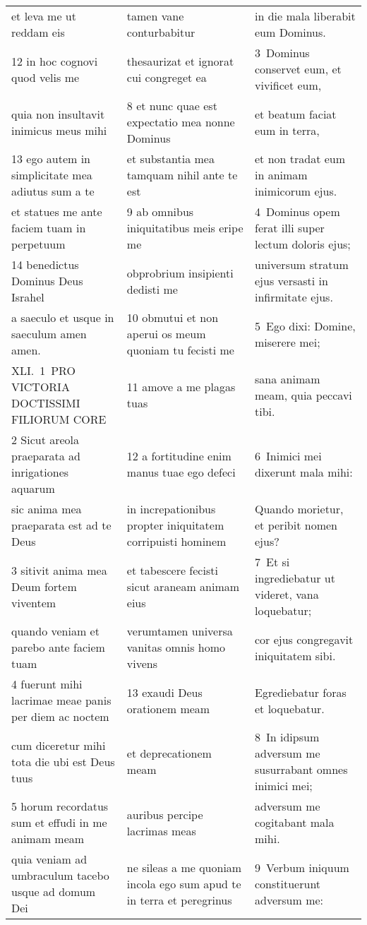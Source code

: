 \documentclass{article}
\begin{document}
\begin{longtable}{@{}p{}p{}p{}@{}}
et leva me ut reddam eis	&	tamen vane conturbabitur	&	in die mala liberabit eum Dominus.	\\
12 in hoc cognovi quod velis me	&	thesaurizat et ignorat cui congreget ea	&	3 Dominus conservet eum, et vivificet eum,	\\
quia non insultavit inimicus meus mihi	&	8 et nunc quae est expectatio mea nonne Dominus	&	et beatum faciat eum in terra,	\\
13 ego autem in simplicitate mea adiutus sum a te	&	et substantia mea tamquam nihil ante te est	&	et non tradat eum in animam inimicorum ejus.	\\
et statues me ante faciem tuam in perpetuum	&	9 ab omnibus iniquitatibus meis eripe me	&	4 Dominus opem ferat illi super lectum doloris ejus;	\\
14 benedictus Dominus Deus Israhel	&	obprobrium insipienti dedisti me	&	universum stratum ejus versasti in infirmitate ejus.	\\
a saeculo et usque in saeculum amen amen.	&	10 obmutui et non aperui os meum quoniam tu fecisti me	&	5 Ego dixi: Domine, miserere mei;	\\
XLI. 1 PRO VICTORIA DOCTISSIMI FILIORUM CORE	&	11 amove a me plagas tuas	&	sana animam meam, quia peccavi tibi.	\\
2 Sicut areola praeparata ad inrigationes aquarum	&	12 a fortitudine enim manus tuae ego defeci	&	6 Inimici mei dixerunt mala mihi:	\\
sic anima mea praeparata est ad te Deus	&	in increpationibus propter iniquitatem corripuisti hominem	&	Quando morietur, et peribit nomen ejus?	\\
3 sitivit anima mea Deum fortem viventem	&	et tabescere fecisti sicut araneam animam eius	&	7 Et si ingrediebatur ut videret, vana loquebatur;	\\
quando veniam et parebo ante faciem tuam	&	verumtamen universa vanitas omnis homo vivens	&	cor ejus congregavit iniquitatem sibi.	\\
4 fuerunt mihi lacrimae meae panis per diem ac noctem	&	13 exaudi Deus orationem meam	&	Egrediebatur foras et loquebatur.	\\
cum diceretur mihi tota die ubi est Deus tuus	&	et deprecationem meam	&	8 In idipsum adversum me susurrabant omnes inimici mei;	\\
5 horum recordatus sum et effudi in me animam meam	&	auribus percipe lacrimas meas	&	adversum me cogitabant mala mihi.	\\
quia veniam ad umbraculum tacebo usque ad domum Dei	&	ne sileas a me quoniam incola ego sum apud te in terra et peregrinus	&	9 Verbum iniquum constituerunt adversum me:	\\

\end{longtable}
\end{document}
